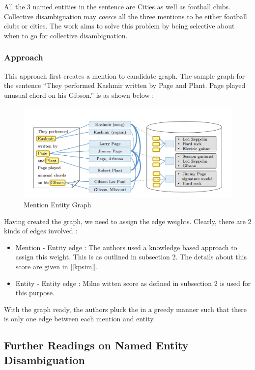 All the 3 named entities in the sentence are Cities as well as football clubs.
Collective disambiguation may \emph{coerce} all the three mentions to be 
either football clubs or cities. The work aims to solve this problem by being selective about when to go for collective disambiguation.

\subsubsection{Approach}
This approach first creates a mention to candidate graph. The sample graph for the sentence ``They performed Kashmir 
written by Page and Plant. Page played unusual chord on his Gibson.'' is as shown below : 
 \begin{figure}[H]
 \centering
 \includegraphics[bb=0 0 1074 469,scale=0.3]{./megraph.png}
 \caption{Mention Entity Graph}
\end{figure}


Having created the graph, we need to assign the edge weights. Clearly, there are 2 kinds of edges involved : 
\begin{itemize}
 \item Mention - Entity edge : The authors used a knowledge based approach to assign this weight. This is as outlined in subsection 2.
 The details about this score are given in [\ref{kpsim}].
 \item Entity - Entity edge : Milne witten score as defined in subsection 2 is used for this purpose.
\end{itemize}

With the graph ready, the authors pluck the in a greedy manner such that there is only one edge between each 
mention and entity.


\subsection{Further Readings on Named Entity Disambiguation}

